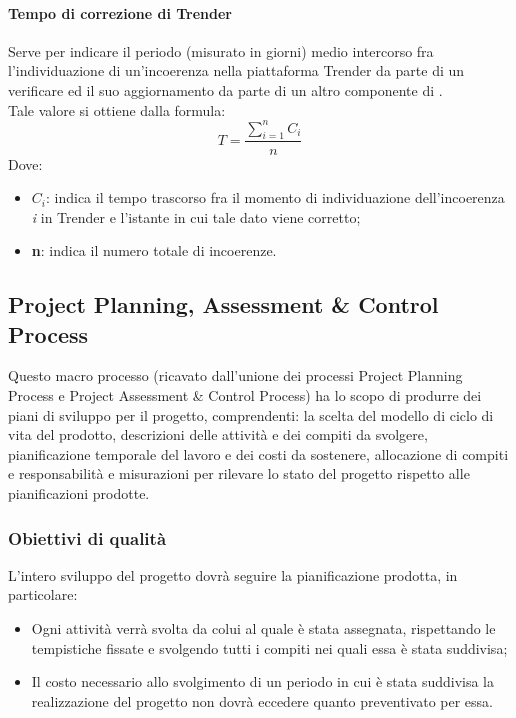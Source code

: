 \documentclass[../PianoDiQualifica.tex]{subfiles}
\begin{document}
			\paragraph{Tempo di correzione di Trender}
			Serve per indicare il periodo (misurato in giorni) medio intercorso fra l'individuazione di un'incoerenza nella piattaforma Trender da parte di un verificare ed il suo aggiornamento da parte di un altro componente di \kpanic.\\Tale valore si ottiene dalla formula:
				\begin{equation*}
					T =\frac{\sum_{i=1}^n C_{i}}{n}
				\end{equation*}
				Dove:
				\begin{itemize}
					\item \textbf{$C_{i}$}: indica il tempo trascorso fra il momento di individuazione dell'incoerenza \textit{i} in Trender e l'istante in cui tale dato viene corretto;
					\item \textbf{n}: indica il numero totale di incoerenze.
				\end{itemize}
			
		\subsection{Project Planning, Assessment \& Control Process}
		Questo macro processo (ricavato dall'unione dei processi Project Planning Process e Project Assessment \& Control Process) ha lo scopo di produrre dei piani di sviluppo per il progetto, comprendenti: la scelta del modello di ciclo di vita del prodotto, descrizioni delle attività e dei compiti da svolgere, pianificazione temporale del lavoro e dei costi da sostenere, allocazione di compiti e responsabilità e misurazioni per rilevare lo stato del progetto rispetto alle pianificazioni prodotte.
		
			\subsubsection{Obiettivi di qualità}
			L'intero sviluppo del progetto dovrà seguire la pianificazione prodotta, in particolare:
			\begin{itemize}
				\item Ogni attività verrà svolta da colui al quale è stata assegnata, rispettando le tempistiche fissate e svolgendo tutti i compiti nei quali essa è stata suddivisa;
				\item Il costo necessario allo svolgimento di un periodo in cui è stata suddivisa la realizzazione del progetto non dovrà eccedere quanto preventivato per essa.
			\end{itemize}
			
\end{document}
